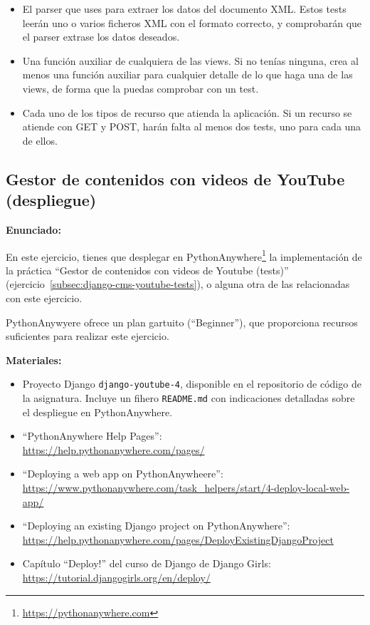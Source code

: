 \begin{itemize}
\item El parser que uses para extraer los datos del documento XML. Estos tests leerán uno o varios ficheros XML con el formato correcto, y comprobarán que el parser extrase los datos deseados.
\item Una función auxiliar de cualquiera de las views. Si no tenías ninguna, crea al menos una función auxiliar para cualquier detalle de lo que haga una de las views, de forma que la puedas comprobar con un test.
\item Cada uno de los tipos de recurso que atienda la aplicación. Si un recurso se atiende con GET y POST, harán falta al menos dos tests, uno para cada una de ellos.
\end{itemize}

\subsection{Gestor de contenidos con videos de YouTube (despliegue)}
\label{subsec:django-cms-youtube-despliegue}

\textbf{Enunciado:}

En este ejercicio, tienes que desplegar en PythonAnywhere\footnote{\url{https://pythonanywhere.com}} la implementación de la práctica  ``Gestor de contenidos con videos de Youtube (tests)'' (ejercicio~\ref{subsec:django-cms-youtube-tests}), o alguna otra de las relacionadas con este ejercicio.

PythonAnywyere ofrece un plan gartuito (``Beginner''), que proporciona recursos suficientes para realizar este ejercicio.

\textbf{Materiales:}

\begin{itemize}
\item Proyecto Django \verb|django-youtube-4|, disponible en el repositorio de código de la asignatura. Incluye un fihero \verb|README.md| con indicaciones detalladas sobre el despliegue en PythonAnywhere.
\item ``PythonAnywhere Help Pages'': \\
  \url{https://help.pythonanywhere.com/pages/}
\item ``Deploying a web app on PythonAnywheere'': \\
  \url{https://www.pythonanywhere.com/task_helpers/start/4-deploy-local-web-app/}
\item ``Deploying an existing Django project on PythonAnywhere'': \\
  \url{https://help.pythonanywhere.com/pages/DeployExistingDjangoProject}
\item Capítulo ``Deploy!'' del curso de Django de Django Girls: \\
  \url{https://tutorial.djangogirls.org/en/deploy/}
\end{itemize}


